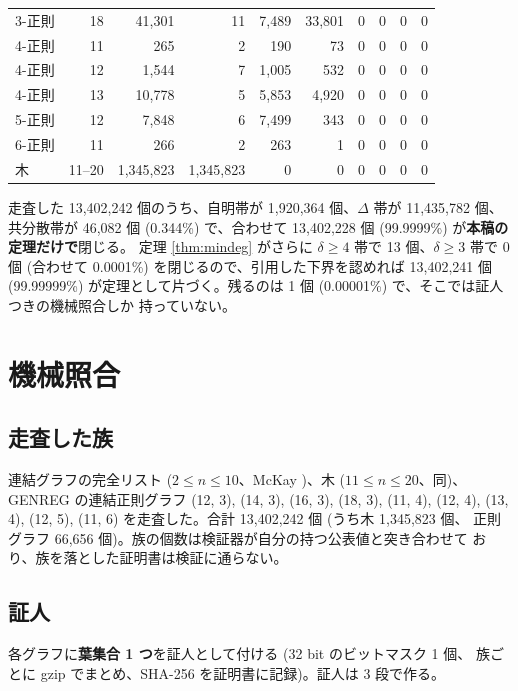 \documentclass[paper=a4,fontsize=10.5pt,jafontsize=10.5pt]{jlreq}
\theoremstyle{plain}
\theoremstyle{definition}
\begin{document}
\begin{table}[t]
\begin{tabular}{lrrrrrrrrr}
3-正則 & 18 & 41,301 & 11 & 7,489 & 33,801 & 0 & 0 & 0 & 0 \\
4-正則 & 11 & 265 & 2 & 190 & 73 & 0 & 0 & 0 & 0 \\
4-正則 & 12 & 1,544 & 7 & 1,005 & 532 & 0 & 0 & 0 & 0 \\
4-正則 & 13 & 10,778 & 5 & 5,853 & 4,920 & 0 & 0 & 0 & 0 \\
5-正則 & 12 & 7,848 & 6 & 7,499 & 343 & 0 & 0 & 0 & 0 \\
6-正則 & 11 & 266 & 2 & 263 & 1 & 0 & 0 & 0 & 0 \\
木 & 11--20 & 1,345,823 & 1,345,823 & 0 & 0 & 0 & 0 & 0 & 0 \\
\bottomrule
\end{tabular}
\end{table}

走査した 13,402,242 個のうち、自明帯が 1,920,364 個、$\Delta$ 帯が
11,435,782 個、共分散帯が 46,082 個 (0.344\%) で、合わせて
13,402,228 個 (99.9999\%) が\textbf{本稿の定理だけで}閉じる。
定理 \ref{thm:mindeg} がさらに
$\delta \ge 4$ 帯で 13 個、$\delta \ge 3$ 帯で 0 個
(合わせて 0.0001\%) を閉じるので、引用した下界を認めれば
13,402,241 個 (99.99999\%) が定理として片づく。残るのは
1 個 (0.00001\%) で、そこでは証人つきの機械照合しか
持っていない。

\section{機械照合}\label{sec:check}

\subsection*{走査した族}

連結グラフの完全リスト ($2 \le n \le 10$、McKay \cite{mckay})、木
($ 11 \le n \le 20$、同)、GENREG \cite{genreg} の連結正則グラフ
(12, 3), (14, 3), (16, 3), (18, 3), (11, 4), (12, 4), (13, 4), (12, 5), (11, 6) を走査した。合計 13,402,242 個 (うち木 1,345,823 個、
正則グラフ 66,656 個)。族の個数は検証器が自分の持つ公表値と突き合わせて
おり、族を落とした証明書は検証に通らない。

\subsection*{証人}

各グラフに\textbf{葉集合 1 つ}を証人として付ける (32 bit のビットマスク 1 個、
族ごとに gzip でまとめ、SHA-256 を証明書に記録)。証人は 3 段で作る。
\end{document}
